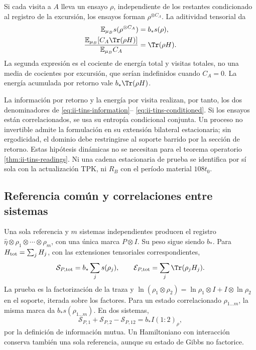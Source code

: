 Si cada visita a $A$ lleva un ensayo $\rho$, independiente de los restantes
condicionado al registro de la excursión, los ensayos forman
$\rho^{\otimes C_A}$. La aditividad tensorial da
\begin{align}
 \mathbb E_{\mu_B}s(\rho^{\otimes C_A})&=b_*s(\rho),\nonumber\\
 \frac{\mathbb E_{\mu_B}[C_A\Tr(\rho H)]}
      {\mathbb E_{\mu_B}C_A}&=\Tr(\rho H).
 \label{eq:ii-tins-visit-readings}
\end{align}
La segunda expresión es el cociente de energía total y visitas totales,
no una media de cocientes por excursión, que serían indefinidos cuando
$C_A=0$. La energía acumulada por retorno vale $b_*\Tr(\rho H)$.

La información por retorno y la energía por visita realizan, por tanto,
los dos denominadores de \eqref{eq:ii-tins-information}--
\eqref{eq:ii-tins-conditioned}. Si los ensayos están correlacionados,
se usa su entropía condicional conjunta. Un proceso no invertible admite
la formulación en su extensión bilateral estacionaria; sin ergodicidad,
el dominio debe restringirse al soporte barrido por la sección de retorno.
Estas hipótesis dinámicas no se necesitan para el teorema operatorio
\ref{thm:ii-tins-readings}. Ni una cadena estacionaria de prueba se identifica
por sí sola con la actualización TPK, ni $R_B$ con el período material
$108t_0$.

\subsection{Referencia común y correlaciones entre sistemas}
\label{subsec:ii-tins-comun}

Una sola referencia y $m$ sistemas independientes producen el registro
$\widehat\eta\otimes\rho_1\otimes\cdots\otimes\rho_m$, con una
única marca $P\otimes I$. Su peso sigue siendo $b_*$. Para
$H_{\rm tot}=\sum_jH_j$, con las extensiones tensoriales correspondientes,
\begin{equation}
 \mathcal S_{P,\rm tot}=b_*\sum_js(\rho_j),\qquad
 \mathcal E_{P,\rm tot}=\sum_j\Tr(\rho_jH_j).
 \label{eq:ii-tins-common}
\end{equation}
La prueba es la factorización de la traza y
$\ln(\rho_1\otimes\rho_2)=\ln\rho_1\otimes I+I\otimes\ln\rho_2$
en el soporte, iterada sobre los factores. Para un estado correlacionado
$\rho_{1\ldots m}$, la misma marca da $b_*s(\rho_{1\ldots m})$. En dos
sistemas,
\begin{equation}
 \mathcal S_{P,1}+\mathcal S_{P,2}-\mathcal S_{P,12}
 =b_*I(1:2)_\rho,
 \label{eq:ii-tins-mutual}
\end{equation}
por la definición de información mutua. Un Hamiltoniano con interacción
conserva también una sola referencia, aunque su estado de Gibbs no factorice.

